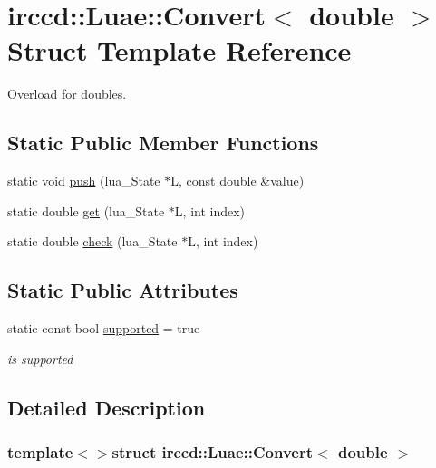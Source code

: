 \hypertarget{a00010}{\section{irccd\-:\-:Luae\-:\-:Convert$<$ double $>$ Struct Template Reference}
\label{a00010}
}


Overload for doubles.  


\subsection*{Static Public Member Functions}
\begin{DoxyCompactItemize}
\item 
static void \hyperlink{a00010_a458a129f484018409b3dc22f055405fd}{push} (lua\-\_\-\-State $\ast$L, const double \&value)
\item 
static double \hyperlink{a00010_ae679bdaef33991ac8f0a318f800a8eb4}{get} (lua\-\_\-\-State $\ast$L, int index)
\item 
static double \hyperlink{a00010_a893d78094f0fbd54f61607343fb4ccfd}{check} (lua\-\_\-\-State $\ast$L, int index)
\end{DoxyCompactItemize}
\subsection*{Static Public Attributes}
\begin{DoxyCompactItemize}
\item 
\hypertarget{a00010_a65a92c83d80ecbfb7b4767dc8680eab4}{static const bool \hyperlink{a00010_a65a92c83d80ecbfb7b4767dc8680eab4}{supported} = true}\label{a00010_a65a92c83d80ecbfb7b4767dc8680eab4}

\begin{DoxyCompactList}\small\item\em is supported \end{DoxyCompactList}\end{DoxyCompactItemize}


\subsection{Detailed Description}
\subsubsection*{template$<$$>$struct irccd\-::\-Luae\-::\-Convert$<$ double $>$}

